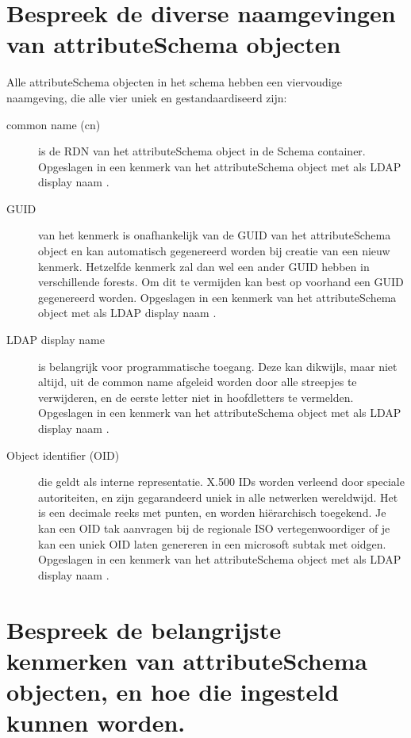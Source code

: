 \section{Bespreek de diverse naamgevingen van attributeSchema objecten}

Alle attributeSchema objecten in het schema hebben een viervoudige naamgeving,
die alle vier uniek en gestandaardiseerd zijn:
\begin{description}
	\item[common name (cn)] is de RDN van het attributeSchema object in de
		Schema container. Opgeslagen in een kenmerk van het
		attributeSchema object met als LDAP display naam .
	\item[GUID] van het kenmerk is onafhankelijk van de GUID van het
		attributeSchema object en kan automatisch gegenereerd worden bij
		creatie van een nieuw kenmerk. Hetzelfde kenmerk zal dan wel een
		ander GUID hebben in verschillende forests. Om dit te vermijden
		kan best op voorhand een GUID gegenereerd worden. Opgeslagen in
		een kenmerk van het attributeSchema object met als LDAP display
		naam .
	\item[LDAP display name] is belangrijk voor programmatische toegang.
		Deze kan dikwijls, maar niet altijd, uit de common name afgeleid
		worden door alle streepjes te verwijderen, en de eerste letter
		niet in hoofdletters te vermelden. Opgeslagen in een kenmerk van
		het attributeSchema object met als LDAP display naam
		.
	\item[Object identifier (OID)] die geldt als interne representatie.
		X.500 IDs worden verleend door speciale autoriteiten, en zijn
		gegarandeerd uniek in alle netwerken wereldwijd. Het is een
		decimale reeks met punten, en worden hiërarchisch toegekend. Je
		kan een OID tak aanvragen bij de regionale ISO vertegenwoordiger
		of je kan een uniek OID laten genereren in een microsoft subtak
		met oidgen. Opgeslagen in een kenmerk van het attributeSchema
		object met als LDAP display naam .
\end{description}

\section{Bespreek de belangrijste kenmerken van attributeSchema objecten, en hoe
die ingesteld kunnen worden.}

